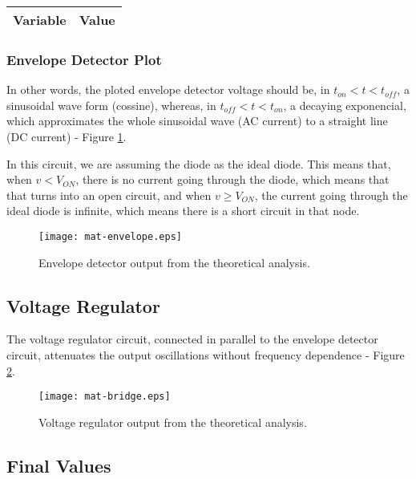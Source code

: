 \begin{tabular}{|l|r|}
  \hline    
  {\bf Variable} & {\bf Value} \\ \hline %
  
\end{tabular}

\subsubsection{Envelope Detector Plot}

In other words, the ploted envelope detector voltage should be, in $t_{on} < t < t_{off}$, a sinusoidal wave form (cossine), whereas, in $t_{off} < t < t_{on}$, a decaying exponencial, which approximates the whole sinusoidal wave (AC current) to a straight line (DC current) - Figure \ref{fig:mat-envelope}.

In this circuit, we are assuming the diode as the ideal diode. This means that, when $v < V_{ON}$, there is no current going through the diode, which means that that turns into an open circuit, and when $v \geq V_{ON}$, the current going through the ideal diode is infinite, which means there is a short circuit in that node.

\begin{figure}[h] \centering
\texttt{[image: mat-envelope.eps]}
\caption{Envelope detector output from the theoretical analysis.}
\label{fig:mat-envelope}
\end{figure}

\subsection{Voltage Regulator}

The voltage regulator circuit, connected in parallel to the envelope detector circuit, attenuates the output oscillations without frequency dependence - Figure \ref{fig:mat-bridge}.

\begin{figure}[h] \centering
\texttt{[image: mat-bridge.eps]}
\caption{Voltage regulator output from the theoretical analysis.}
\label{fig:mat-bridge}
\end{figure}

\subsection{Final Values}

